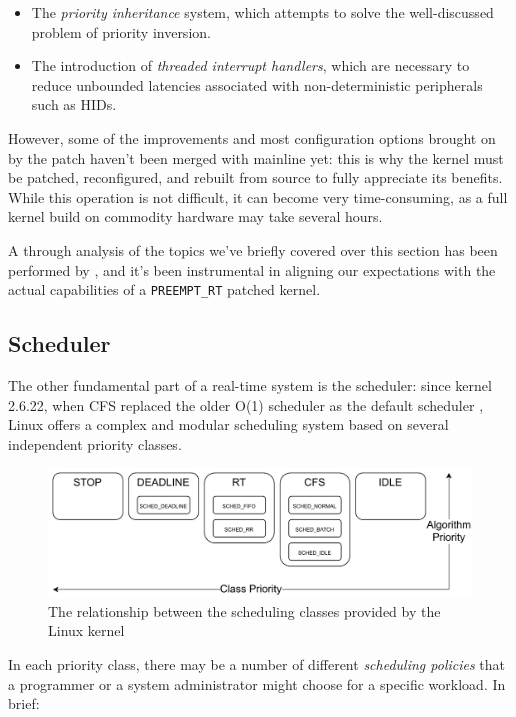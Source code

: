 \documentclass[a4paper,12pt]{report}
\begin{document}
\begin{itemize}
    \item The \textit{priority inheritance} system, which attempts to solve the well-discussed problem of priority inversion.
    \item The introduction of \textit{threaded interrupt handlers}, which are necessary to reduce unbounded latencies associated with non-deterministic peripherals such as HIDs.
\end{itemize}

However, some of the improvements and most configuration options brought on by the patch haven't been merged with mainline yet: this is why the kernel must be patched, reconfigured, and rebuilt from source to fully appreciate its benefits. While this operation is not difficult, it can become very time-consuming, as a full kernel build on commodity hardware may take several hours.

A through analysis of the topics we've briefly covered over this section has been performed by \textcite{survey-preempt-rt}, and it's been instrumental in aligning our expectations with the actual capabilities of a \texttt{PREEMPT\_RT} patched kernel.

\subsection{Scheduler}

The other fundamental part of a real-time system is the scheduler: since kernel 2.6.22, when CFS replaced the older O(1) scheduler as the default scheduler \cite{lwn-cfs-merge}, Linux offers a complex and modular scheduling system based on several independent priority classes. 

\begin{figure}[H]
    \centering
    \includegraphics[width=\textwidth]{img/sched-class.pdf}
    \caption{The relationship between the scheduling classes provided by the Linux kernel}
\end{figure}

In each priority class, there may be a number of different \textit{scheduling policies} that a programmer or a system administrator might choose for a specific workload. In brief: 
\end{document}
